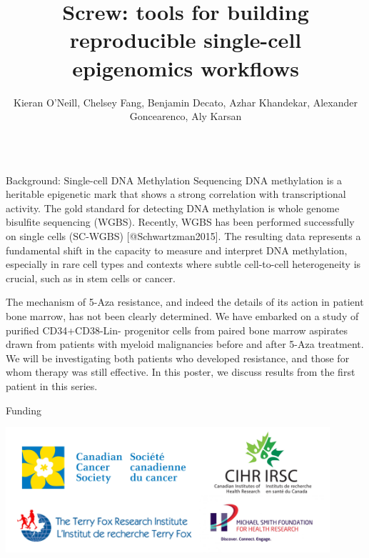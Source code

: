 \documentclass{beamer}
\title{Screw: tools for building reproducible single-cell epigenomics workflows}
\author{Kieran O'Neill, Chelsey Fang, Benjamin Decato,  Azhar Khandekar, Alexander Goncearenco, Aly Karsan}
\institute{Genome Sciences Centre, BC Cancer Agency, Vancouver, BC, Canada}
\begin{document}
\begin{frame}
\begin{columns}[t]



\begin{column}{.32\textwidth}


\begin{block}{Background: Single-cell DNA Methylation Sequencing}
DNA methylation is a heritable epigenetic mark that shows a strong correlation with transcriptional activity. 
The gold standard for detecting DNA methylation is whole genome bisulfite sequencing (WGBS). 
Recently, WGBS has been performed successfully on single cells (SC-WGBS) [@Schwartzman2015].
The resulting data represents a fundamental shift in the capacity to measure and interpret DNA methylation, especially in rare cell types and contexts where subtle cell-to-cell heterogeneity is crucial, such as in stem cells or cancer. 

\begin{figure}
\begin{center}
\end{center}
\end{figure}

The mechanism of 5-Aza resistance, and indeed the details of its action in patient bone marrow, has not been clearly determined. We have embarked on a study of purified CD34+CD38-Lin- progenitor cells from paired bone marrow aspirates drawn from patients with myeloid malignancies before and after 5-Aza treatment. We will be investigating both patients who developed resistance, and those for whom therapy was still effective. In this poster, we discuss results from the first patient in this series.

\end{block}




\begin{block}{Funding}
\begin{center}
\includegraphics[width=0.9\textwidth]{figures/funding.pdf}
\end{center}


\end{block}
\end{column}
\end{columns}
\end{frame}
\end{document}
